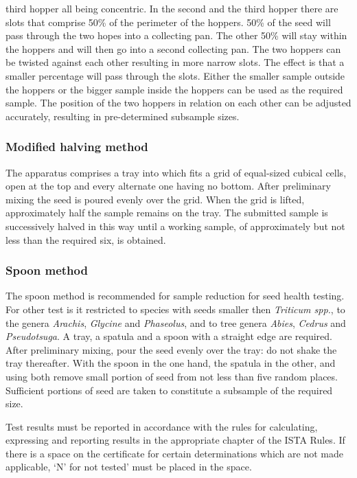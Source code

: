 \documentclass[]{book}
\begin{document}
\begin{enumerate}
  third hopper all being concentric. In the second and the third hopper
  there are slots that comprise 50\% of the perimeter of the hoppers.
  50\% of the seed will pass through the two hopes into a collecting
  pan. The other 50\% will stay within the hoppers and will then go into
  a second collecting pan. The two hoppers can be twisted against each
  other resulting in more narrow slots. The effect is that a smaller
  percentage will pass through the slots. Either the smaller sample
  outside the hoppers or the bigger sample inside the hoppers can be
  used as the required sample. The position of the two hoppers in
  relation on each other can be adjusted accurately, resulting in
  pre-determined subsample sizes.
\end{enumerate}

\subsubsection{Modified halving method}\label{modified-halving-method}

The apparatus comprises a tray into which fits a grid of equal-sized
cubical cells, open at the top and every alternate one having no bottom.
After preliminary mixing the seed is poured evenly over the grid. When
the grid is lifted, approximately half the sample remains on the tray.
The submitted sample is successively halved in this way until a working
sample, of approximately but not less than the required six, is
obtained.

\subsubsection{Spoon method}\label{spoon-method}

The spoon method is recommended for sample reduction for seed health
testing. For other test is it restricted to species with seeds smaller
then \emph{Triticum spp.}, to the genera \emph{Arachis}, \emph{Glycine}
and \emph{Phaseolus}, and to tree genera \emph{Abies}, \emph{Cedrus} and
\emph{Pseudotsuga}. A tray, a spatula and a spoon with a straight edge
are required. After preliminary mixing, pour the seed evenly over the
tray: do not shake the tray thereafter. With the spoon in the one hand,
the spatula in the other, and using both remove small portion of seed
from not less than five random places. Sufficient portions of seed are
taken to constitute a subsample of the required size.

Test results must be reported in accordance with the rules for
calculating, expressing and reporting results in the appropriate chapter
of the ISTA Rules. If there is a space on the certificate for certain
determinations which are not made applicable, `N' for not tested' must
be placed in the space.
\end{document}
